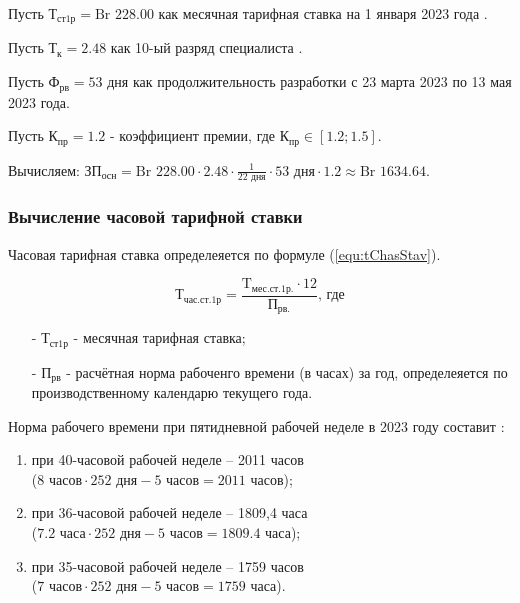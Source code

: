 Пусть $\text{Т}_\text{ст1р} = \text{Br } 228.00$ как месячная тарифная ставка на 1 января 2023 года \cite{economic_BazovayaStavkaMyFin} \cite{economic_BazovayaStavka} \cite{economic_BazovayaStavkaPravoBy} \cite{economic_BazovayaStavkaPravoByPdf}.

Пусть $\text{Т}_\text{к} = 2.48$ как 10-ый разряд специалиста \cite{economic_TarifniKoeficientPravoBy} \cite{economic_TarifniKoeficientPravoByPdf}.

Пусть $\text{Ф}_\text{рв} = 53 \text{ дня}$ как продолжительность разработки с 23 марта 2023 по 13 мая 2023 года.

Пусть $\text{К}_\text{пр} = 1.2$ - коэффициент премии, где $\text{К}_\text{пр} \in [1.2; 1.5]$.

Вычисляем: $\text{ЗП}_\text{осн} = \text{Br } 228.00 \cdot 2.48 \cdot \frac{ 1 }{ 22 \text{ дня} } \cdot 53 \text{ дня} \cdot 1.2 \approx \text{Br } 1634.64$.

\subsubsection*{Вычисление часовой тарифной ставки}

Часовая тарифная ставка определеяется по формуле (\ref{equ:tChasStav}).

\begin{equation}
    \label{equ:tChasStav}
    \text{Т}_\text{час.ст.1р} = \frac{ \text{T}_\text{мес.ст.1р.} \cdot 12 }{ \text{П}_\text{рв.} } \text{, где}
\end{equation}

\begin{enumerate}
    \item[-] $\text{Т}_\text{ст1р}$ - месячная тарифная ставка;
    \item[-] $\text{П}_\text{рв}$ - расчётная норма рабоченго времени (в часах) за год,
    определеяется по производственному календарю текущего года.
\end{enumerate}

Норма рабочего времени при пятидневной рабочей неделе в 2023 году составит \cite{RBnormRabVrem}:
\begin{enumerate}
    \item при 40-часовой рабочей неделе – 2011 часов \\
    ($8 \text{ часов} \cdot 252 \text{ дня} - 5 \text{ часов} = 2011 \text{ часов}$);
    \item при 36-часовой рабочей неделе – 1809,4 часа \\
    ($7.2 \text{ часа} \cdot 252 \text{ дня} - 5 \text{ часов} = 1809.4 \text{ часа}$);
    \item при 35-часовой рабочей неделе – 1759 часов \\
    ($7 \text{ часов} \cdot 252 \text{ дня} - 5 \text{ часов} = 1759 \text{ часа}$).
\end{enumerate}

